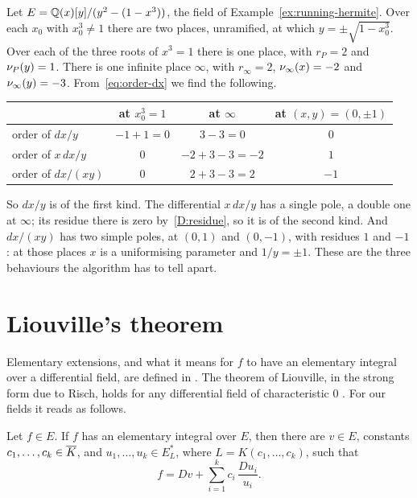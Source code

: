 \begin{example}\label{ex:running-differentials}
Let $E = \mathbb{Q}(x)[y]/(y^2 - (1 - x^3))$, the field of
Example~\ref{ex:running-hermite}. Over each $x_0$ with $x_0^3 \ne 1$ there are
two places, unramified, at which $y = \pm\sqrt{1 - x_0^3}$. Over each of the
three roots of $x^3 = 1$ there is one place, with $r_P = 2$ and $\nu_{P}(y) =
1$. There is one infinite place $\infty$, with $r_\infty = 2$, $\nu_{\infty}(x)
= -2$ and $\nu_{\infty}(y) = -3$. From~\eqref{eq:order-dx} we find the
following.
\begin{center}
\begin{tabular}{@{}lccc@{}}
\toprule
 & at $x_0^3 = 1$ & at $\infty$ & at $(x, y) = (0, \pm 1)$ \\
\midrule
order of $dx/y$      & $-1 + 1 = 0$ & $3 - 3 = 0$ & $0$ \\
order of $x\,dx/y$   & $0$          & $-2 + 3 - 3 = -2$ & $1$ \\
order of $dx/(x y)$  & $0$          & $2 + 3 - 3 = 2$ & $-1$ \\
\bottomrule
\end{tabular}
\end{center}
So $dx/y$ is of the first kind. The differential $x\,dx/y$ has a single
pole, a double one at $\infty$; its residue there is zero by~\ref{D:residue},
so it is of the second kind. And $dx/(xy)$ has two simple poles, at $(0, 1)$
and $(0, -1)$, with residues $1$ and $-1$: at those places $x$ is a
uniformising parameter and $1/y = \pm 1$. These are the three behaviours the
algorithm has to tell apart.
\end{example}

\section{Liouville's theorem}\label{sec:liouville-theorem}

Elementary extensions, and what it means for $f$ to have an elementary
integral over a differential field, are defined in
. The theorem of Liouville, in the strong
form due to Risch, holds for any differential field of characteristic $0$
. For our fields it reads as follows.

\begin{theorem}[Liouville]\label{thm:liouville}
Let $f \in E$. If $f$ has an elementary integral over $E$, then there are $v
\in E$, constants $c_1, \dots, c_k \in \overline{K}$, and $u_1, \dots, u_k \in
E_L^*$, where $L = K(c_1, \dots, c_k)$, such that
\begin{equation}\label{eq:liouville}
  f = Dv + \sum_{i=1}^k c_i\, \frac{Du_i}{u_i} .
\end{equation}
\end{theorem}


